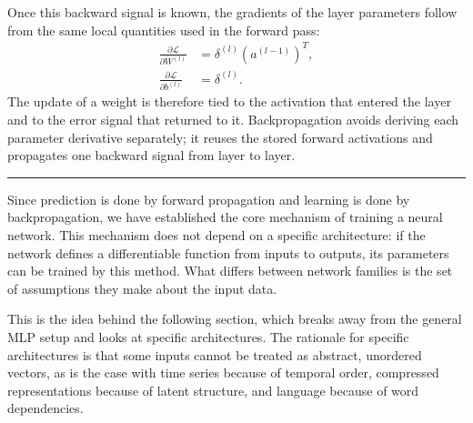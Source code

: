 Once this backward signal is known, the gradients of the layer parameters follow from the same local quantities used in the forward pass:
\begin{align}
    \frac{\partial \mathcal{L}}{\partial W^{(l)}} &= \delta^{(l)}\left(a^{(l-1)}\right)^{T},\\
    \frac{\partial \mathcal{L}}{\partial b^{(l)}} &= \delta^{(l)}.
\end{align}
The update of a weight is therefore tied to the activation that entered the layer and to the error signal that returned to it. Backpropagation avoids deriving each parameter derivative separately; it reuses the stored forward activations and propagates one backward signal from layer to layer.

\vspace{0.8em}
\noindent\rule{\textwidth}{0.4pt}
\vspace{0.8em}

Since prediction is done by forward propagation and learning is done by backpropagation, we have established the core mechanism of training a neural network. This mechanism does not depend on a specific architecture: if the network defines a differentiable function from inputs to outputs, its parameters can be trained by this method. What differs between network families is the set of assumptions they make about the input data.

This is the idea behind the following section, which breaks away from the general MLP setup and looks at specific architectures. The rationale for specific architectures is that some inputs cannot be treated as abstract, unordered vectors, as is the case with time series because of temporal order, compressed representations because of latent structure, and language because of word dependencies.
